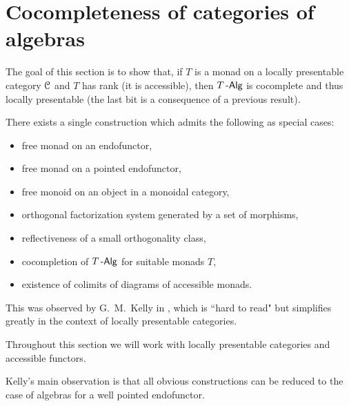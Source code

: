 \documentclass[a4paper,11pt,oneside,openany]{scrbook}
\begin{document}
\section{Cocompleteness of categories of algebras}
The goal of this section is to show that, if $T$ is a monad on a locally presentable category $\operatorname{\mathcal{C}}$ and $T$ has rank (it is accessible), then $T\operatorname{-\mathsf{Alg}}$ is cocomplete and thus locally presentable (the last bit is a consequence of a previous result).

There exists a single construction which admits the following as special cases:
\begin{itemize}
	\item free monad on an endofunctor,
	\item free monad on a pointed endofunctor,
	\item free monoid on an object in a monoidal category,
	\item orthogonal factorization system generated by a set of morphisms,
	\item reflectiveness of a small orthogonality class,
	\item cocompletion of $T\operatorname{-\mathsf{Alg}}$ for suitable monads $T$,
	\item existence of colimits of diagrams of accessible monads.
\end{itemize}
This was observed by G.\ M.\ Kelly in \cite{kelly1980unified}, which is ``hard to read" but simplifies greatly in the context of locally presentable categories.

Throughout this section we will work with locally presentable categories and accessible functors.

Kelly's main observation is that all obvious constructions can be reduced to the case of algebras for a well pointed endofunctor.
\end{document}
